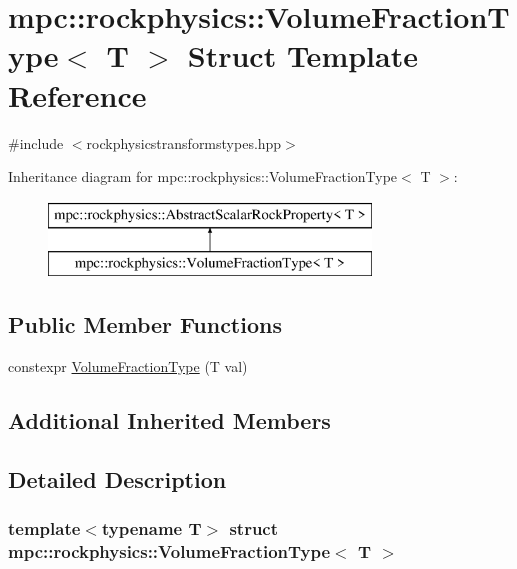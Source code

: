 \hypertarget{structmpc_1_1rockphysics_1_1_volume_fraction_type}{}\section{mpc\+:\+:rockphysics\+:\+:Volume\+Fraction\+Type$<$ T $>$ Struct Template Reference}
\label{structmpc_1_1rockphysics_1_1_volume_fraction_type}


{\ttfamily \#include $<$rockphysicstransformstypes.\+hpp$>$}

Inheritance diagram for mpc\+:\+:rockphysics\+:\+:Volume\+Fraction\+Type$<$ T $>$\+:\begin{figure}[H]
\begin{center}
\leavevmode
\includegraphics[height=2.000000cm]{structmpc_1_1rockphysics_1_1_volume_fraction_type}
\end{center}
\end{figure}
\subsection*{Public Member Functions}
\begin{DoxyCompactItemize}
\item 
constexpr \mbox{\hyperlink{structmpc_1_1rockphysics_1_1_volume_fraction_type_ad5e14aa452a7314daaa79c72d37c63a4}{Volume\+Fraction\+Type}} (T val)
\end{DoxyCompactItemize}
\subsection*{Additional Inherited Members}


\subsection{Detailed Description}
\subsubsection*{template$<$typename T$>$\newline
struct mpc\+::rockphysics\+::\+Volume\+Fraction\+Type$<$ T $>$}



